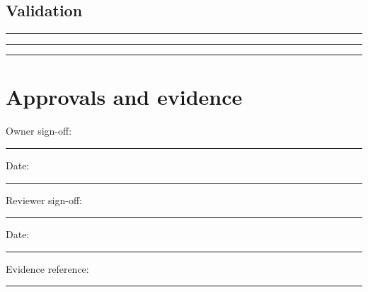 \documentclass[11pt]{article}
\begin{document}
\subsection{Validation}
\noindent\rule{\linewidth}{0.3pt}\par\vspace{0.18in}
\noindent\rule{\linewidth}{0.3pt}\par\vspace{0.18in}
\noindent\rule{\linewidth}{0.3pt}\par\vspace{0.14in}

\section{Approvals and evidence}
\noindent Owner sign-off: \rule{0.42\linewidth}{0.4pt}\hfill Date: \rule{0.19\linewidth}{0.4pt}\par\vspace{0.4cm}
\noindent Reviewer sign-off: \rule{0.40\linewidth}{0.4pt}\hfill Date: \rule{0.19\linewidth}{0.4pt}\par\vspace{0.4cm}
\noindent Evidence reference: \rule{0.70\linewidth}{0.4pt}
\end{document}
